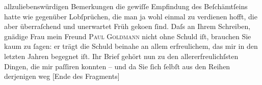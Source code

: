 \begin{ledgroupsized}[t]{13cm}
               allzuliebenswürdigen Bemerkungen die gewiſſe Empfindung des Beſchämtſeins hatte wie
               gegenüber Lobſprüchen, die man ja wohl einmal zu verdienen hofft, die aber
               überraſchend und unerwartet Früh geko{\geminationm}en ſind.\pend
           \pstart
           {\pb}Daſs an Ihrem Schreiben, gnädige Frau mein Freund \textsc{Paul Goldmann} nicht ohne Schuld iſt, brauchen Sie kaum zu ſagen: er trägt die Schuld beinahe
               an allem erfreulichem, das mir in den letzten Jahren begegnet iſt. Ihr Brief gehört
               nun zu den allererfreulichſsten Dingen, die mir paſſiren konnten – und da Sie ſich
               ſelbſt aus den Reihen derjenigen weg {[}Ende des Fragments{]}\pend
           
         
         \endnumbering{}\end{ledgroupsized}  \newcommand{\dateiname}{L00337}\newcommand{\titel}{Arthur Schnitzler an Lou Andreas-Salomé, 13. 6. 1894}\newcommand{\editorInnen}{Martin Anton Müller und Gerd-Hermann Susen}
      